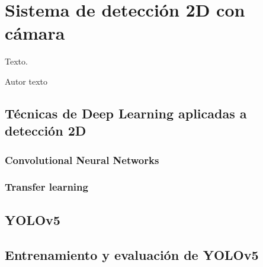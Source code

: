 \chapter{Sistema de detección 2D con cámara}
\label{cha:Sistema de detección 2D con cámara}

\begin{FraseCelebre}
  \begin{Frase}
    Texto.
  \end{Frase}
  \begin{Fuente}
    Autor texto
  \end{Fuente}
\end{FraseCelebre}

\section{Técnicas de Deep Learning aplicadas a detección 2D}
\label{sec:Técnicas de Deep Learning aplicadas a detección 2D}

\subsection{Convolutional Neural Networks}
\label{sec:Convolutional Neural Networks}

\subsection{Transfer learning}
\label{sec:Transfer learning}

\section{YOLOv5}
\label{sec:YOLOv5}

\section{Entrenamiento y evaluación de YOLOv5}
\label{sec:Entrenamiento y evaluación de YOLOv5}
